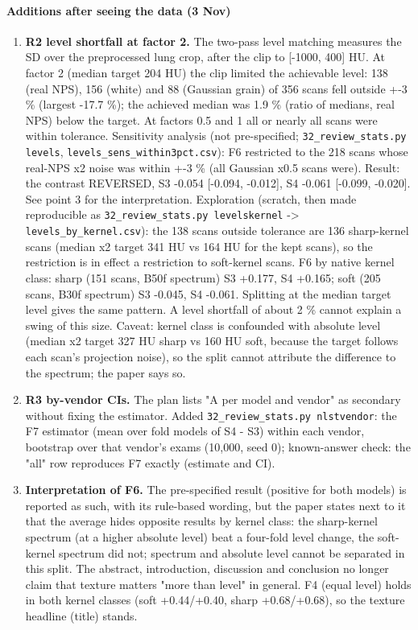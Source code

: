 \paragraph*{Additions after seeing the data (3 Nov)}
\begin{enumerate}
\item \textbf{R2 level shortfall at factor 2.} The two-pass level matching measures the SD over the preprocessed lung crop, after the clip to [-1000, 400] HU. At factor 2 (median target 204 HU) the clip limited the achievable level: 138 (real NPS), 156 (white) and 88 (Gaussian grain) of 356 scans fell outside +-3 \% (largest -17.7 \%); the achieved median was 1.9 \% (ratio of medians, real NPS) below the target. At factors 0.5 and 1 all or nearly all scans were within tolerance. Sensitivity analysis (not pre-specified; \texttt{32\_review\_stats.py levels}, \texttt{levels\_sens\_within3pct.csv}): F6 restricted to the 218 scans whose real-NPS x2 noise was within +-3 \% (all Gaussian x0.5 scans were). Result: the contrast REVERSED, S3 -0.054 [-0.094, -0.012], S4 -0.061 [-0.099, -0.020]. See point 3 for the interpretation. Exploration (scratch, then made reproducible as \texttt{32\_review\_stats.py levelskernel} -\textgreater{} \texttt{levels\_by\_kernel.csv}): the 138 scans outside tolerance are 136 sharp-kernel scans (median x2 target 341 HU vs 164 HU for the kept scans), so the restriction is in effect a restriction to soft-kernel scans. F6 by native kernel class: sharp (151 scans, B50f spectrum) S3 +0.177, S4 +0.165; soft (205 scans, B30f spectrum) S3 -0.045, S4 -0.061. Splitting at the median target level gives the same pattern. A level shortfall of about 2 \% cannot explain a swing of this size. Caveat: kernel class is confounded with absolute level (median x2 target 327 HU sharp vs 160 HU soft, because the target follows each scan's projection noise), so the split cannot attribute the difference to the spectrum; the paper says so.
\item \textbf{R3 by-vendor CIs.} The plan lists "A per model and vendor" as secondary without fixing the estimator. Added \texttt{32\_review\_stats.py nlstvendor}: the F7 estimator (mean over fold models of S4 - S3) within each vendor, bootstrap over that vendor's exams (10,000, seed 0); known-answer check: the "all" row reproduces F7 exactly (estimate and CI).
\item \textbf{Interpretation of F6.} The pre-specified result (positive for both models) is reported as such, with its rule-based wording, but the paper states next to it that the average hides opposite results by kernel class: the sharp-kernel spectrum (at a higher absolute level) beat a four-fold level change, the soft-kernel spectrum did not; spectrum and absolute level cannot be separated in this split. The abstract, introduction, discussion and conclusion no longer claim that texture matters "more than level" in general. F4 (equal level) holds in both kernel classes (soft +0.44/+0.40, sharp +0.68/+0.68), so the texture headline (title) stands.
\end{enumerate}

